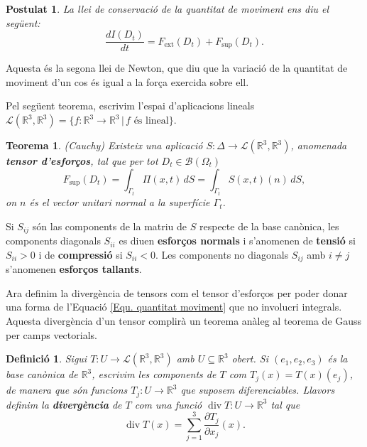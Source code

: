 \documentclass{article}
\numberwithin{equation}{section}
\DeclareMathOperator{\diver}{div}
\newtheorem{teorema}{Teorema}[section]
\newtheorem{definicio}{Definici\'{o}}[section]
\newtheorem{postulat}{Postulat}[section]
\begin{document}
\begin{postulat}\label{Pos: quantitat moviment}
La llei de conservaci\'{o} de la quantitat de moviment ens diu el seg\"{u}ent:
\begin{equation}\label{Equ. quantitat moviment}
\frac{dI(D_t)}{dt}=F_{\text{ext}}(D_t)+F_{\text{sup}}(D_t).
\end{equation}
\end{postulat}

Aquesta \'{e}s la segona llei de Newton, que diu que la variaci\'{o} de la quantitat de moviment d'un cos \'{e}s igual a la for\c{c}a exercida sobre ell.

Pel seg\"{u}ent teorema, escrivim l'espai d'aplicacions lineals $\mathcal{L}(\mathbb{R}^3,\mathbb{R}^3)=\{f:\mathbb{R}^3\rightarrow\mathbb{R}^3\,|\,f\text{ \'{e}s lineal}\}$.

\begin{teorema}
(Cauchy) Existeix una aplicaci\'{o} $S:\Delta\rightarrow\mathcal{L}(\mathbb{R}^3,\mathbb{R}^3)$, anomenada \textbf{tensor d'esfor\c{c}os}, tal que per tot $D_t\in\mathcal{B}(\Omega_t)$
\[F_{\text{sup}}(D_t)=\int_{\Gamma_t}\Pi(x,t)\,dS=\int_{\Gamma_t}S(x,t)(n)\,dS,\]
on $n$ \'{e}s el vector unitari normal a la superf\'{i}cie $\Gamma_t$.
\end{teorema}

Si $S_{ij}$ s\'{o}n las components de la matriu de $S$ respecte de la base can\`{o}nica, les components diagonals $S_{ii}$ es diuen \textbf{esfor\c{c}os normals} i s'anomenen de \textbf{tensi\'{o}} si $S_{ii}>0$ i de \textbf{compressi\'{o}} si $S_{ii}<0$. Les components no diagonals $S_{ij}$ amb $i\neq j$ s'anomenen \textbf{esfor\c{c}os tallants}.

Ara definim la diverg\`{e}ncia de tensors com el tensor d'esfor\c{c}os per poder donar una forma de l'Equaci\'{o} \eqref{Equ. quantitat moviment} que no involucri integrals. Aquesta diverg\`{e}ncia d'un tensor complir\`{a} un teorema an\`{a}leg al teorema de Gauss per camps vectorials.

\begin{definicio}
Sigui $T:U\rightarrow\mathcal{L}(\mathbb{R}^3,\mathbb{R}^3)$ amb $U\subseteq\mathbb{R}^3$ obert. Si $(e_1,e_2,e_3)$ \'{e}s la base can\`{o}nica de $\mathbb{R}^3$, escrivim les components de $T$ com $T_j(x)=T(x)(e_j)$, de manera que s\'{o}n funcions $T_j:U\rightarrow\mathbb{R}^3$ que suposem diferenciables. Llavors definim la \textbf{diverg\`{e}ncia} de $T$ com una funci\'{o} $\diver T:U\rightarrow\mathbb{R}^3$ tal que
\begin{equation}
\diver T(x)=\sum_{j=1}^3\frac{\partial T_{j}}{\partial x_j}(x).
\end{equation}
\end{definicio}
\end{document}
